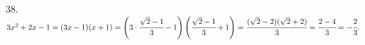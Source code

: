 38. $3x^2+2x-1=(3x-1)(x+1)=\left(3\cdot\cfrac{\sqrt{2}-1}{3}-1\right)\left(\cfrac{\sqrt{2}-1}{3}+1\right)=\cfrac{(\sqrt{2}-2)(\sqrt{2}+2)}{3}=\cfrac{2-4}{3}=-\cfrac{2}{3}.$\\
